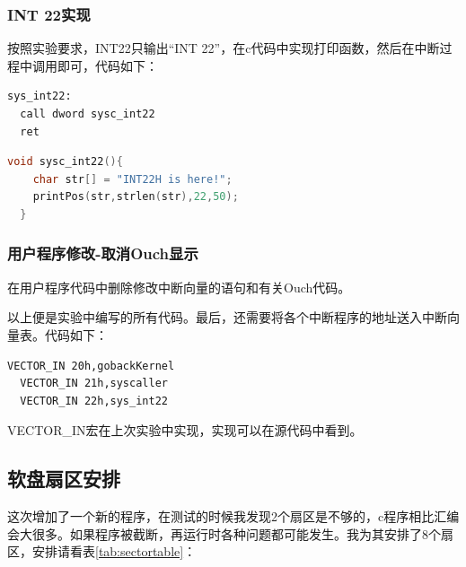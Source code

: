 \documentclass[a4paper, 11pt]{article} %
\begin{document}
\subsubsection{INT 22实现}
按照实验要求，INT22只输出“INT 22”，在c代码中实现打印函数，然后在中断过程中调用即可，代码如下：
\begin{lstlisting}[language={[x86masm]Assembler},label=sysint22,caption=22号中断的汇编过程]
sys_int22:
  call dword sysc_int22
  ret
\end{lstlisting}

\begin{lstlisting}[language={c},label=syscint22,caption=22号中断的c函数]
  void sysc_int22(){
    char str[] = "INT22H is here!";
    printPos(str,strlen(str),22,50);
  }
\end{lstlisting}
  
\subsubsection{用户程序修改-取消Ouch显示}
在用户程序代码中删除修改中断向量的语句和有关Ouch代码。

以上便是实验中编写的所有代码。最后，还需要将各个中断程序的地址送入中断向量表。代码如下：
\begin{lstlisting}[language={[x86masm]Assembler},label=IVT,caption=将中断程序地址写入中断向量表]
  VECTOR_IN 20h,gobackKernel
  VECTOR_IN 21h,syscaller
  VECTOR_IN 22h,sys_int22
\end{lstlisting}
VECTOR\_IN宏在上次实验中实现，实现可以在源代码中看到。

\subsection{软盘扇区安排}
这次增加了一个新的程序，在测试的时候我发现2个扇区是不够的，c程序相比汇编会大很多。如果程序被截断，再运行时各种问题都可能发生。我为其安排了8个扇区，安排请看表\ref{tab:sectortable}：
\end{document}
